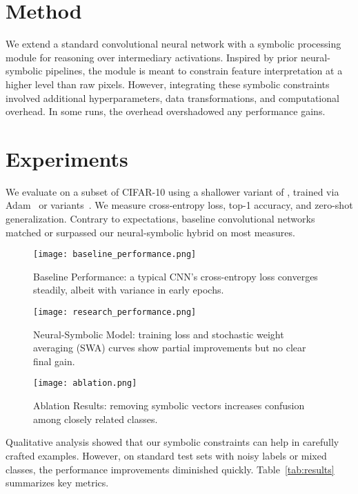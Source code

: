 \documentclass{article}
\begin{document}
\section{Method}
We extend a standard convolutional neural network with a symbolic processing module for reasoning over intermediary activations. Inspired by prior neural-symbolic pipelines, the module is meant to constrain feature interpretation at a higher level than raw pixels. However, integrating these symbolic constraints involved additional hyperparameters, data transformations, and computational overhead. In some runs, the overhead overshadowed any performance gains.

\section{Experiments}
We evaluate on a subset of CIFAR-10 using a shallower variant of \cite{simonyan2014very}, trained via Adam~\citep{kingma2014adam} or variants~\citep{dozat2016incorporating}. We measure cross-entropy loss, top-1 accuracy, and zero-shot generalization. Contrary to expectations, baseline convolutional networks matched or surpassed our neural-symbolic hybrid on most measures.

\begin{figure}[t]
  \centering
  \texttt{[image: baseline\_performance.png]}
  \caption{Baseline Performance: a typical CNN's cross-entropy loss converges steadily, albeit with variance in early epochs.}
  \label{fig:baseline}
\end{figure}

\begin{figure}[t]
  \centering
  \texttt{[image: research\_performance.png]}
  \caption{Neural-Symbolic Model: training loss and stochastic weight averaging (SWA) curves show partial improvements but no clear final gain.}
  \label{fig:hybrid}
\end{figure}

\begin{figure}[t]
  \centering
  \texttt{[image: ablation.png]}
  \caption{Ablation Results: removing symbolic vectors increases confusion among closely related classes.}
  \label{fig:ablation}
\end{figure}

\noindent 
Qualitative analysis showed that our symbolic constraints can help in carefully crafted examples. However, on standard test sets with noisy labels or mixed classes, the performance improvements diminished quickly. Table~\ref{tab:results} summarizes key metrics.
\end{document}
